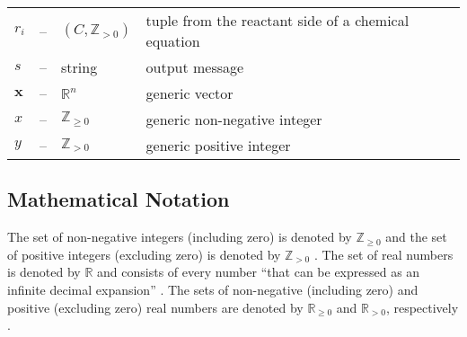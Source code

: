 \documentclass[12pt]{article}
\newcommand*{\nonnegInt}{\mathbb{Z}_{\geq 0}}
\newcommand*{\posInt}{\mathbb{Z}_{> 0}}
\newcommand*{\nonnegReal}{\mathbb{R}_{\geq 0}}
\newcommand*{\posReal}{\mathbb{R}_{> 0}}
\begin{document}
\begin{tabularx}{\textwidth}{l l l X}
  $r_i$           & --            & $(C, \posInt)$            & tuple from the reactant side of a chemical equation \\
  $s$             & --            & string                    & output message                                      \\
  $\textbf{x}$    & --            & $\mathbb{R}^{n}$          & generic vector                                      \\
  $x$             & --            & $\nonnegInt$              & generic non-negative integer                        \\
  $y$             & --            & $\posInt$                 & generic positive integer                            \\
  \bottomrule
\end{tabularx}

\subsection{Mathematical Notation} \label{sec_mathNot}

The set of non-negative integers (including zero) is denoted by $\nonnegInt$
and the set of positive integers (excluding zero) is denoted by $\posInt$
\cite{wikipedia_natural_2023}. The
set of real numbers is denoted by $\mathbb{R}$ and consists of every number
``that can be expressed as an infinite decimal expansion''
\cite{the_editors_of_encyclopaedia_britannica_real_2022}. The sets of
non-negative (including zero) and positive (excluding zero) real numbers are
denoted by $\nonnegReal$ and $\posReal$, respectively
\cite{wikipedia_positive_2023}.
\end{document}
